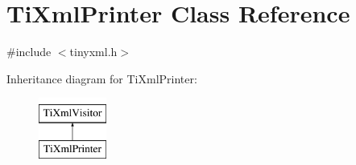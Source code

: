 \hypertarget{classTiXmlPrinter}{\section{Ti\-Xml\-Printer Class Reference}
\label{classTiXmlPrinter}
}


{\ttfamily \#include $<$tinyxml.\-h$>$}

Inheritance diagram for Ti\-Xml\-Printer\-:\begin{figure}[H]
\begin{center}
\leavevmode
\includegraphics[height=2.000000cm]{classTiXmlPrinter}
\end{center}
\end{figure}
